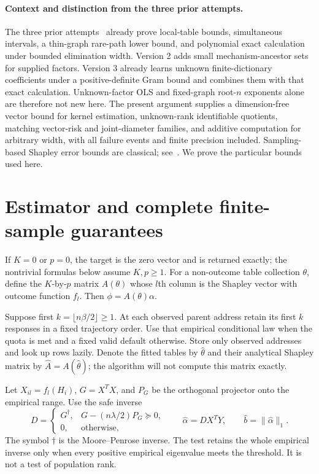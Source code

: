 \documentclass[11pt,a4paper]{article}
\numberwithin{equation}{section}
\theoremstyle{definition}
\begin{document}
\paragraph{Context and distinction from the three prior attempts.}
The three prior attempts~\cite{prior} already prove local-table bounds, simultaneous
intervals, a thin-graph rare-path lower bound, and polynomial exact
calculation under bounded elimination width. Version 2 adds small
mechanism-ancestor sets for supplied factors. Version 3 already learns
unknown finite-dictionary coefficients under a positive-definite Gram
bound and combines them with that exact calculation. Unknown-factor OLS
and fixed-graph root-$n$ exponents alone are therefore not new here.
The present argument supplies a dimension-free vector bound for kernel
estimation, unknown-rank identifiable quotients, matching vector-risk and
joint-diameter families, and additive computation for arbitrary width,
with all failure events and finite precision included. Sampling-based
Shapley error bounds are classical; see~\cite{sampling}. We prove the
particular bounds used here.

\section{Estimator and complete finite-sample guarantees}\label{sec:main}

If $K=0$ or $p=0$, the target is the zero vector and is returned exactly;
the nontrivial formulas below assume $K,p\ge1$.
For a non-outcome table collection $\theta$, define the $K$-by-$p$ matrix
$A(\theta)$ whose $l$th column is the Shapley vector with outcome function
$f_l$. Then $\phi=A(\theta)\alpha$.

Suppose first $k=\lfloor n\beta/2\rfloor\ge1$. At each observed parent
address retain its first $k$ responses in a fixed trajectory order.
Use that empirical conditional law when the quota is met and a fixed
valid default otherwise. Store only observed addresses and look up rows
lazily. Denote the fitted tables by $\widehat\theta$ and their analytical
Shapley matrix by $\widehat A=A(\widehat\theta)$; the algorithm will not
compute this matrix exactly.

Let $X_{il}=f_l(H_i)$, $G=X^T X$, and $P_G$ be the orthogonal projector
onto the empirical range. Use the safe inverse
\begin{equation}\label{eq:estimator}
 D=\begin{cases}G^\dagger,&G-(n\lambda/2)P_G\succeq0,\\
 0,&\text{otherwise},\end{cases}
 \qquad \widehat\alpha=DX^T Y,
 \qquad \widehat b=\|\widehat\alpha\|_1.
\end{equation}
The symbol $\dagger$ is the Moore--Penrose inverse. The test retains the
whole empirical inverse only when every positive empirical eigenvalue
meets the threshold. It is not a test of population rank.
\end{document}
